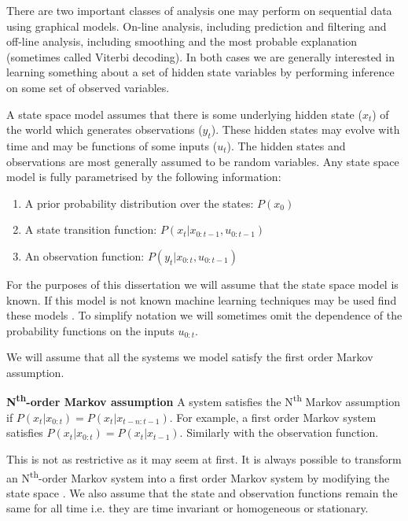 There are two important classes of analysis one may perform on sequential data using graphical models. On-line analysis, including prediction and filtering and off-line analysis, including smoothing and the most probable explanation (sometimes called Viterbi decoding). In both cases we are generally interested in learning something about a set of hidden state variables by performing inference on some set of observed variables. 

A state space model assumes that there is some underlying hidden state ($x_t$) of the world which generates observations ($y_t$). These hidden states may evolve with time and may be functions of some inputs ($u_t$). The hidden states and observations are most generally assumed to be random variables. Any state space model is fully parametrised by the following information:
\begin{enumerate}
\item
A prior probability distribution over the states: $P(x_0)$
\item
A state transition function: $P(x_t|x_{0:t-1}, u_{0:t-1})$
\item
An observation function: $P(y_t|x_{0:t}, u_{0:t-1})$
\end{enumerate} 
For the purposes of this dissertation we will assume that the state space model is known. If this model is not known machine learning techniques may be used find these models \cite{murphy1}. To simplify notation we will sometimes omit the dependence of the probability functions on the inputs $u_{0:t}$.

We will assume that all the systems we model satisfy the first order Markov assumption.
\begin{defn}
\textbf{N\textsuperscript{th}-order Markov assumption} A system satisfies the N\textsuperscript{th} Markov assumption if $P(x_t|x_{0:t})=P(x_t|x_{t-n:t-1})$. For example, a first order Markov system satisfies  $P(x_t|x_{0:t})=P(x_t|x_{t-1})$. Similarly with the observation function.
\end{defn}
This is not as restrictive as it may seem at first. It is always possible to transform an N\textsuperscript{th}-order Markov system into a first order Markov system by modifying the state space \cite{murphy1}. We also assume that the state and observation functions remain the same for all time i.e. they are time invariant or homogeneous or stationary.

